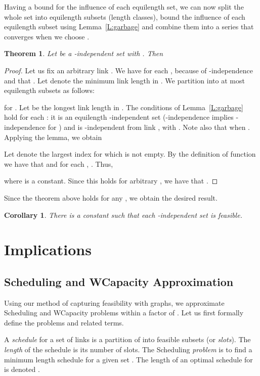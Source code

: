 \documentclass[11pt]{article}
\newcommand{\subsec}[1]{\subsection{#1}}
\newtheorem{corollary}{Corollary}
\newtheorem{theorem}{Theorem}
\newcommand{\wcapacity}{\textsf{WCapacity}}
\newcommand{\scheduling}{\textsf{Scheduling}}
\begin{document}
 
 Having a bound for the influence of each equilength set, we can now split the whole set into equilength subsets (length classes), bound the influence of each equilength subset using Lemma~\ref{L:garbage} and combine them into a series that converges when we choose .
  \begin{theorem}\label{T:main}
   Let  be a -independent set with . 
Then
 
 \end{theorem}

  \begin{proof}
  Let us fix an arbitrary link .
We have for each ,
 because of -independence and that . Let  denote the minimum link length in . 
We partition  into at most  equilength subsets  as follows: 

 for . Let  be the longest link length in .
The conditions of Lemma~\ref{L:garbage} hold for each : it is an equilength -independent set (-independence implies -independence for ) and is -independent from link , with . Note also that  when . Applying the lemma, we obtain

Let  denote the largest index  for which  is not empty. By the definition of function  we have that  and for each , . Thus, 

where  is a constant. Since this holds for arbitrary , we have that .
 \end{proof}


Since the theorem above holds for any , we 
obtain the desired result.
\begin{corollary}\label{C:mainresult}
There is a constant  such that each -independent set is feasible.
\end{corollary}




\section{Implications}\label{S:mainresult}


\subsec{{\scheduling} and {\wcapacity} Approximation}
Using our method of capturing feasibility with graphs, we approximate {\scheduling} and {\wcapacity} problems within a factor of . Let us first formally define the problems and related terms.

A \emph{schedule} for a set  of links is a partition of  into feasible subsets (or \emph{slots}). 
The \emph{length} of the schedule is its number of slots.
The {\scheduling} \emph{problem} is to find a minimum length schedule for a given set . The length of an optimal schedule for  is denoted \label{G:opts}.
\end{document}
